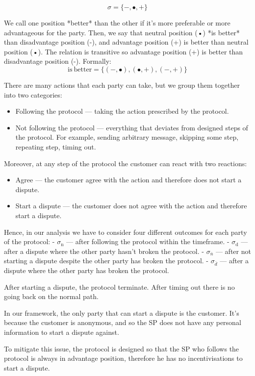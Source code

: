 \documentclass{article}
\begin{document}
$$\sigma = \{-, •, +\}$$

We call one position *better* than the other if it's more preferable or more advantageous for the party. Then, we say that neutral position (•) *is better* than disadvantage position (-), and advantage position (+) is better than neutral position (•). The relation is transitive so advantage position (+) is better than disadvantage position (-). Formally: 
$$
\mathrm{is\ better} = \{(-,•), (•,+), (-,+)\}
$$

There are many actions that each party can take, but we group them together into two categories: 
\begin{itemize}
    \item Following the protocol — taking the action prescribed by the protocol.
    \item Not following the protocol — everything that deviates from designed steps of the protocol. For example, sending arbitrary message, skipping some step, repeating step, timing out. 
\end{itemize}

Moreover, at any step of the protocol the customer can react with two reactions: 
\begin{itemize}
    \item Agree — the customer agree with the action and therefore does not start a dispute.
    \item Start a dispute — the customer does not agree with the action and therefore start a dispute.
\end{itemize}

Hence, in our analysis we have to consider four different outcomes for each party of the protocol:
- $\sigma_\mathrm{n}$ — after following the protocol within the timeframe.
- $\sigma_\mathrm{d}$ — after a dispute where the other party hasn't broken the protocol.
- $\sigma_\overline{n}$ — after not starting a dispute despite the other party has broken the protocol.
- $\sigma_\overline{d}$ — after a dispute where the other party has broken the protocol.

After starting a dispute, the protocol terminate. After timing out there is no going back on the normal path.

In our framework, the only party that can start a dispute is the customer. It's because the customer is anonymous, and so the SP does not have any personal information to start a dispute against. 

To mitigate this issue, the protocol is designed so that the SP who follows the protocol is always in advantage position, therefore he has no incentivisations to start a dispute. 
\end{document}
